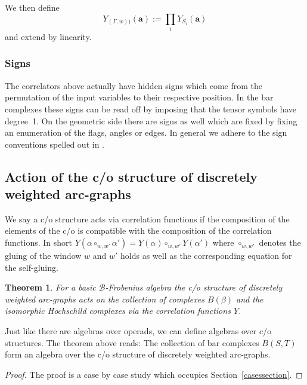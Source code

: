 \documentclass[11pt]{article}
\newtheorem{thm}{Theorem}[section]
\def\B{\mathcal B}
\begin{document}
We then def\/ine{\samepage
\begin{equation}
\label{cordefgraph}
Y_{(\Gamma,w))}({\mathbf a}):=\prod_i Y_{S_i}({\mathbf a})
\end{equation}
and extend by linearity.}


\subsubsection{Signs} The correlators above actually have hidden signs which come
from the permutation of the input variables to their respective position. In the bar complexes these signs can be read of\/f by imposing that the tensor symbols have degree~1. On the geometric side
there are signs as well which are f\/ixed by f\/ixing an enumeration of the f\/lags, angles or edges.
In general we adhere to the sign conventions spelled out in \cite[Section 1.3.4]{hoch2}.




\subsection{Action of the c/o structure of discretely weighted arc-graphs}


We say a c/o structure acts via correlation functions if the
composition of the elements of the c/o is compatible with the
composition of the correlation functions. In short $Y(\alpha
\circ_{w,w'} \alpha')=Y(\alpha)  \circ_{w,w'} Y(\alpha')$ where
$\circ_{w,w'} $ denotes the gluing of the window $w$ and $w'$ holds
as well as the corresponding equation for the self-gluing.


\begin{thm}
\label{discretethm} For a basic  $\B$-Frobenius algebra the c/o
structure of discretely weighted arc-graphs acts  on  the
collection of complexes $B(\beta)$ and the isomorphic Hochschild
complexes via the correlation functions $Y$.
\end{thm}

Just like there are algebras over operads, we can def\/ine algebras
over c/o structures.  The theorem above reads: The collection of bar
complexes $B(S,T)$ form an algebra over the c/o structure of
discretely weighted arc-graphs.

\begin{proof}
The proof is a case by case study which occupies Section~\ref{casessection}.
\end{proof}
\end{document}
